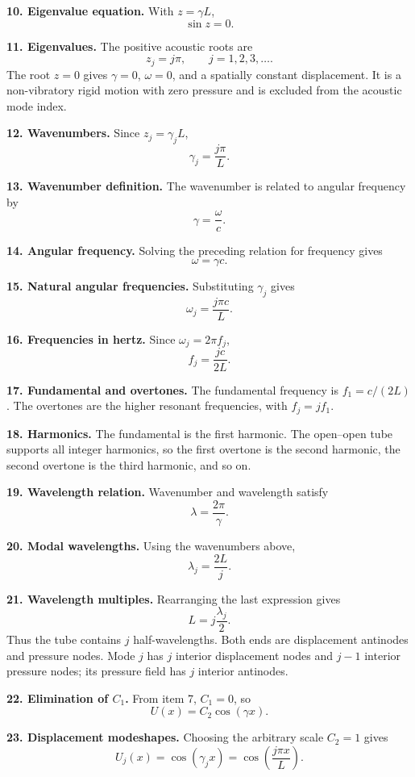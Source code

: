 \textbf{10. Eigenvalue equation.} With $z=\gamma L$,
\[
\boxed{\sin z=0}.
\]

\textbf{11. Eigenvalues.} The positive acoustic roots are
\[
\boxed{z_j=j\pi},\qquad j=1,2,3,\ldots.
\]
The root $z=0$ gives $\gamma=0$, $\omega=0$, and a spatially constant displacement. It is a non-vibratory rigid motion with zero pressure and is excluded from the acoustic mode index.

\textbf{12. Wavenumbers.} Since $z_j=\gamma_jL$,
\[
\boxed{\gamma_j=\frac{j\pi}{L}}.
\]

\textbf{13. Wavenumber definition.} The wavenumber is related to angular frequency by
\[
\boxed{\gamma=\frac{\omega}{c}}.
\]

\textbf{14. Angular frequency.} Solving the preceding relation for frequency gives
\[
\boxed{\omega=\gamma c}.
\]

\textbf{15. Natural angular frequencies.} Substituting $\gamma_j$ gives
\[
\boxed{\omega_j=\frac{j\pi c}{L}}.
\]

\textbf{16. Frequencies in hertz.} Since $\omega_j=2\pi f_j$,
\[
\boxed{f_j=\frac{jc}{2L}}.
\]

\textbf{17. Fundamental and overtones.} The fundamental frequency is $f_1=c/(2L)$. The overtones are the higher resonant frequencies, with $f_j=jf_1$.

\textbf{18. Harmonics.} The fundamental is the first harmonic. The open--open tube supports all integer harmonics, so the first overtone is the second harmonic, the second overtone is the third harmonic, and so on.

\textbf{19. Wavelength relation.} Wavenumber and wavelength satisfy
\[
\boxed{\lambda=\frac{2\pi}{\gamma}}.
\]

\textbf{20. Modal wavelengths.} Using the wavenumbers above,
\[
\boxed{\lambda_j=\frac{2L}{j}}.
\]

\textbf{21. Wavelength multiples.} Rearranging the last expression gives
\[
\boxed{L=j\frac{\lambda_j}{2}}.
\]
Thus the tube contains $j$ half-wavelengths. Both ends are displacement antinodes and pressure nodes. Mode $j$ has $j$ interior displacement nodes and $j-1$ interior pressure nodes; its pressure field has $j$ interior antinodes.

\textbf{22. Elimination of $C_1$.} From item 7, $C_1=0$, so
\[
\boxed{U(x)=C_2\cos(\gamma x)}.
\]

\textbf{23. Displacement modeshapes.} Choosing the arbitrary scale $C_2=1$ gives
\[
\boxed{U_j(x)=\cos(\gamma_jx)=\cos\left(\frac{j\pi x}{L}\right)}.
\]

